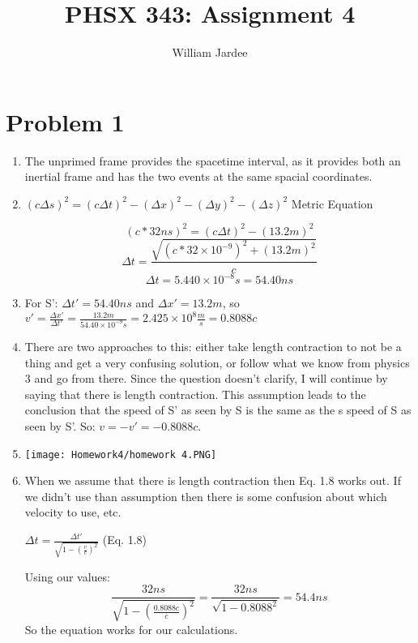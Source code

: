 \documentclass[11pt]{article}
\begin{document}
\date{}

\title{PHSX 343: Assignment 4}

\author{William Jardee}

\maketitle


\section*{Problem 1}

\begin{enumerate}[label=\alph*)]
    \item 
    The unprimed frame provides the spacetime interval, as it provides both an inertial frame and has the two events at the same spacial coordinates. 
    
    \item 
    $(c\Delta s)^2 = (c\Delta t)^2 -(\Delta x)^2 - (\Delta y)^2 -(\Delta z)^2$  Metric Equation

    \[(c*32ns)^2 = (c\Delta t)^2 - (13.2m)^2\]
    \[\Delta t = \frac{\sqrt{(c*32\times 10^{-9})^2 + (13.2 m)^2}}{c}\]
    \[\Delta t = 5.440\times 10^{-8}s = 54.40 ns\]
    
 
    \item
    For S': $\Delta t' = 54.40 ns$ and $\Delta x' = 13.2 m$, so $v' = \frac{\Delta x'}{\Delta t'} = \frac{13.2m}{54.40\times 10^{-9} s} = 2.425 \times 10^{8} \frac{m}{s}= 0.8088c$
    
    
    \item
    There are two approaches to this: either take length contraction to not be a thing and get a very confusing solution, or follow what we know from physics 3 and go from there. Since the question doesn't clarify, I will continue by saying that there is length contraction. This assumption leads to the conclusion that the speed of S' as seen by S is the same as the s speed of S as seen by S'. So: $v = -v' = -0.8088c$.\\
    
    
    \item
        \parbox{0}{ \texttt{[image: Homework4/homework 4.PNG]}}
    
    \item
    When we assume that there is length contraction then Eq. 1.8 works out. If we didn't use than assumption then there is some confusion about which velocity to use, etc.  
    \begin{center} $\Delta t = \frac{\Delta t'}{\sqrt{1-(\frac{v}{c})^2}}$  (Eq. 1.8)
    \end{center}
    Using our values:
    \[\frac{32ns}{\sqrt{1-(\frac{0.8088c}{c})^2}} = \frac{32ns}{\sqrt{1-0.8088^2}} = 54.4ns\]
    So the equation works for our calculations.


\end{enumerate}
\end{document}
